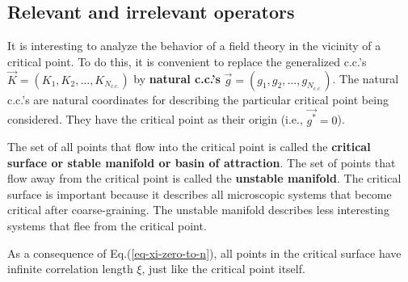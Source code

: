 \subsection{Relevant and irrelevant operators}

It is interesting
to analyze the behavior
of a field theory in the vicinity
of a critical point.
To do this, it
is convenient to replace
the
generalized c.c.'s
$\vec{K}=(K_1, K_2,\ldots, K_{N_{c.c.}})$
by \textbf{natural c.c.'s}
$\vec{g}=(g_1, g_2,\ldots, g_{N_{c.c.}})$.
The natural c.c.'s are natural
coordinates for describing
the particular
critical point
being considered. They
have the critical point as their origin
(i.e., $\vec{g^*}=0$).

The set of all points that flow into
 the critical point 
is called the \textbf{critical surface or stable manifold
or basin of attraction}.
The set of points that flow away from the critical point is called the {\bf unstable manifold}.
The critical surface is important because it describes all microscopic systems that become critical after coarse-graining.
The unstable manifold describes less 
interesting systems that flee from the critical point.

As a consequence
of Eq.(\ref{eq-xi-zero-to-n}),
all points in the critical surface
have infinite correlation length $\xi$,
just like the critical point
itself.


